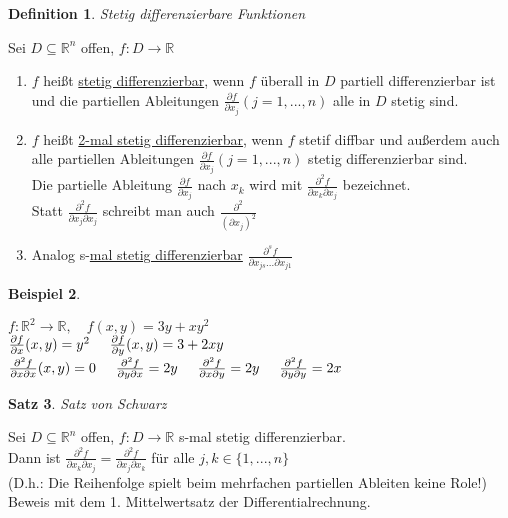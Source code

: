 \documentclass[a4paper,11pt]{article}
\newtheorem{definition}{Definition}[section]
\newtheorem{satz}[definition]{Satz}
\newtheorem{bsp}[definition]{Beispiel}
\newcommand{\hsp}{\hspace{5mm}}
\begin{document}
\newpage

\begin{definition}
	Stetig differenzierbare Funktionen
\end{definition}
Sei $D\subseteq\mathbb{R}^n$ offen, $f\colon D\to\mathbb{R}$ 
\begin{enumerate}[label=\alph*)]
	\item $f$ heißt \underline{stetig differenzierbar}, wenn $f$ überall in $D$ partiell differenzierbar ist und die partiellen Ableitungen $\frac{\partial f}{\partial x_j}(j=1,...,n)$ alle in $D$ stetig sind.
	\item $f$ heißt \underline{2-mal stetig differenzierbar}, wenn $f$ stetif diffbar und außerdem auch alle partiellen Ableitungen $\frac{\partial f}{\partial x_j}(j=1,...,n)$ stetig differenzierbar sind. \\
	Die partielle Ableitung $\frac{\partial f}{\partial x_j}$ nach $x_k$ wird mit $\frac{\partial^2 f}{\partial x_k\partial x_j}$ bezeichnet. \\
	Statt $\frac{\partial^2 f}{\partial x_j\partial x_j}$ schreibt man auch $\frac{\partial^2}{(\partial x_j)^2}$
	\item Analog s-\underline{mal stetig differenzierbar} $\frac{\partial^s f}{\partial x_{js}...\partial x_{j1}}$ 
\end{enumerate}

\begin{bsp}
\end{bsp}
$f\colon\mathbb{R}^2\to\mathbb{R},\quad f(x,y)=3y+xy^2$ \\
$\frac{\partial f}{\partial x}(x,y)=y^2\hsp\frac{\partial f}{\partial y}(x,y)=3+2xy$ \\
$\frac{\partial^2 f}{\partial x\partial x}(x,y)=0\hsp\frac{\partial^2 f}{\partial y\partial x}=2y\hsp\frac{\partial^2 f}{\partial x\partial y}=2y\hsp\frac{\partial^2 f}{\partial y\partial y}=2x$

\begin{satz}
	Satz von Schwarz
\end{satz}
Sei $D\subseteq\mathbb{R}^n$ offen, $f\colon D\to\mathbb{R}$ s-mal stetig differenzierbar. \\
Dann ist $\frac{\partial^2 f}{\partial x_k\partial x_j}=\frac{\partial^2 f}{\partial x_j\partial x_k}$ für alle $j,k\in\{1,...,n\}$ \\
(D.h.: Die Reihenfolge spielt beim mehrfachen partiellen Ableiten keine Role!) \\
Beweis mit dem 1. Mittelwertsatz der Differentialrechnung.
\end{document}
